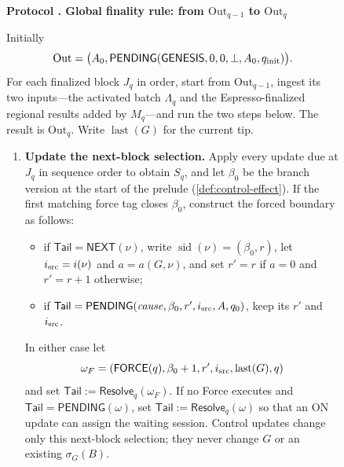 \documentclass[11pt,a4paper]{article}
\newcommand{\tagg}[1]{\ensuremath{\mathsf{#1}}}
\newcounter{protocol}
\newenvironment{protocol}[3][htbp]{\begin{figure}[#1]\refstepcounter{protocol}\label{#2}
\begin{mdframed}[linewidth=.6pt,skipabove=0pt,skipbelow=0pt,
innertopmargin=7pt,innerbottommargin=7pt]\small
\textbf{Protocol \theprotocol. #3}\par\smallskip}{\end{mdframed}\end{figure}}
\begin{document}
\begin{protocol}[H]{alg:global-rule}{Global finality rule: from $\mathrm{Out}_{q-1}$ to $\mathrm{Out}_q$}
Initially
\[
 \mathrm{Out}=
 \bigl(A_0,\tagg{PENDING}(\tagg{GENESIS},0,0,\bot,A_0,q_{\rm init})\bigr).
\]
For each finalized block $J_q$ in order, start from $\mathrm{Out}_{q-1}$,
ingest its two inputs---the activated batch $\Lambda_q$ and the
Espresso-finalized regional results added by $M_q$---and run the two
steps below.  The result is $\mathrm{Out}_q$.  Write
$\operatorname{last}(G)$ for the current tip.
\begin{enumerate}[label=\textbf{\arabic*)},itemsep=3pt]
\item \textbf{Update the next-block selection.}
Apply every update due at $J_q$ in sequence order to obtain $S_q$, and
let $\beta_0$ be the branch version at the start of the prelude
(\cref{def:control-effect}).  If the first matching force tag closes
$\beta_0$, construct the forced boundary as follows:
  \begin{itemize}[itemsep=1pt]
  \item if $\mathsf{Tail}=\tagg{NEXT}(\nu)$, write
  $\operatorname{sid}(\nu)=(\beta_0,r)$, let $i_{\rm src}=i(\nu)$ and
  $a=a(G,\nu)$, and set $r'=r$ if $a=0$ and $r'=r+1$ otherwise;
  \item if $\mathsf{Tail}=\tagg{PENDING}
  (\mathit{cause},\beta_0,r',i_{\rm src},A,q_0)$, keep its $r'$ and
  $i_{\rm src}$.
  \end{itemize}
In either case let
\[
 \omega_F=(\tagg{FORCE}(q),\beta_0+1,r',i_{\rm src},
           \operatorname{last}(G),q)
\]
and set $\mathsf{Tail}:=\tagg{Resolve}_q(\omega_F)$.  If no Force
executes and $\mathsf{Tail}=\tagg{PENDING}(\omega)$, set
$\mathsf{Tail}:=\tagg{Resolve}_q(\omega)$ so that an ON update can assign
the waiting session.  Control updates change only this next-block
selection; they never change $G$ or an existing $\sigma_G(B)$.


\end{enumerate}
\end{protocol}
\end{document}
